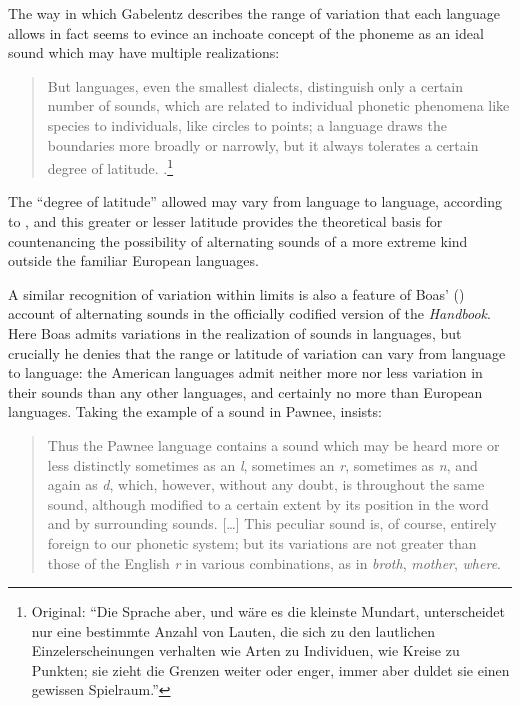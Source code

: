 \documentclass[output=paper]{langscibook}
\begin{document}
The way in which Gabelentz describes the range of variation that each language allows in fact seems to evince an inchoate concept of the phoneme as an ideal sound which may have multiple realizations:

\begin{quotation}
But languages, even the smallest dialects, distinguish only a certain number of sounds, which are related to individual phonetic phenomena like species to individuals, like circles to points; a language draws the boundaries more broadly or narrowly, but it always tolerates a certain degree of latitude. \citep[35]{Gabelentz20161891}.\footnote{Original: ``Die Sprache aber, und wäre es die kleinste Mundart, unterscheidet nur eine bestimmte Anzahl von Lauten, die sich zu den lautlichen Einzelerscheinungen verhalten wie Arten zu Individuen, wie Kreise zu Punkten; sie zieht die Grenzen weiter oder enger, immer aber duldet sie einen gewissen Spielraum.''}
\end{quotation}
 
The ``degree of latitude'' allowed may vary from language to language, according to \citet[197-198]{Gabelentz20161891}, and this greater or lesser latitude provides the theoretical basis for countenancing the possibility of alternating sounds of a more extreme kind outside the familiar European languages.

A similar recognition of variation within limits is also a feature of Boas' (\citeyear{Boas1911}) account of alternating sounds in the officially codified version of the \emph{Handbook}. Here Boas admits variations in the realization of sounds in languages, but crucially he denies that the range or latitude of variation can vary from language to language: the American languages admit neither more nor less variation in their sounds than any other languages, and certainly no more than European languages. Taking the example of a sound in Pawnee, \citet[17]{Boas1911} insists:

\begin{quotation}
Thus the Pawnee language contains a sound which may be heard more or less distinctly sometimes as an \emph{l}, sometimes an \emph{r}, sometimes as \emph{n}, and again as \emph{d}, which, however, without any doubt, is throughout the same sound, although modified to a certain extent by its position in the word and by surrounding sounds. […] This peculiar sound is, of course, entirely foreign to our phonetic system; but its variations are not greater than those of the English \emph{r} in various combinations, as in \emph{broth}, \emph{mother}, \emph{where}. \citep[17]{Boas1911}
\end{quotation}
\end{document}
